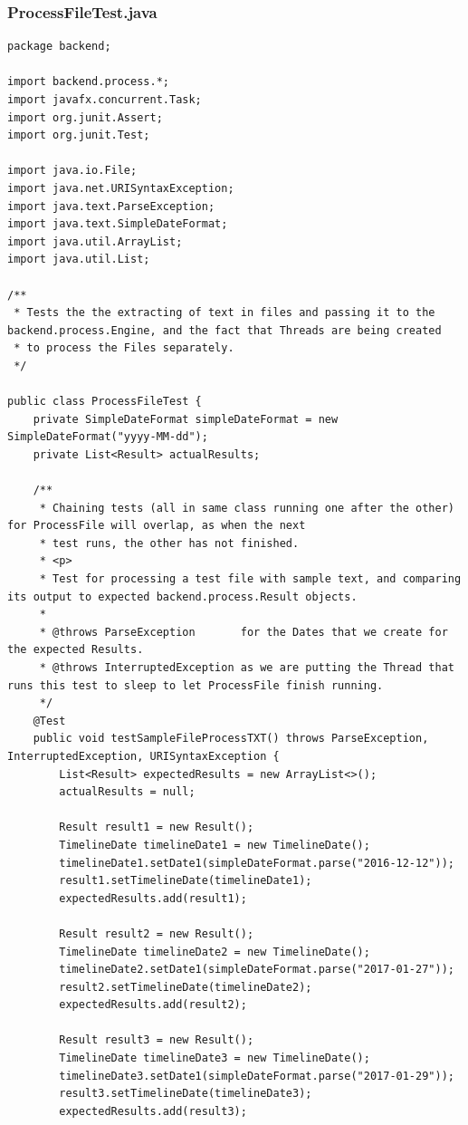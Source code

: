 \subsubsection{ProcessFileTest.java}
\begin{lstlisting}
package backend;

import backend.process.*;
import javafx.concurrent.Task;
import org.junit.Assert;
import org.junit.Test;

import java.io.File;
import java.net.URISyntaxException;
import java.text.ParseException;
import java.text.SimpleDateFormat;
import java.util.ArrayList;
import java.util.List;

/**
 * Tests the the extracting of text in files and passing it to the backend.process.Engine, and the fact that Threads are being created
 * to process the Files separately.
 */

public class ProcessFileTest {
    private SimpleDateFormat simpleDateFormat = new SimpleDateFormat("yyyy-MM-dd");
    private List<Result> actualResults;

    /**
     * Chaining tests (all in same class running one after the other) for ProcessFile will overlap, as when the next
     * test runs, the other has not finished.
     * <p>
     * Test for processing a test file with sample text, and comparing its output to expected backend.process.Result objects.
     *
     * @throws ParseException       for the Dates that we create for the expected Results.
     * @throws InterruptedException as we are putting the Thread that runs this test to sleep to let ProcessFile finish running.
     */
    @Test
    public void testSampleFileProcessTXT() throws ParseException, InterruptedException, URISyntaxException {
        List<Result> expectedResults = new ArrayList<>();
        actualResults = null;

        Result result1 = new Result();
        TimelineDate timelineDate1 = new TimelineDate();
        timelineDate1.setDate1(simpleDateFormat.parse("2016-12-12"));
        result1.setTimelineDate(timelineDate1);
        expectedResults.add(result1);

        Result result2 = new Result();
        TimelineDate timelineDate2 = new TimelineDate();
        timelineDate2.setDate1(simpleDateFormat.parse("2017-01-27"));
        result2.setTimelineDate(timelineDate2);
        expectedResults.add(result2);

        Result result3 = new Result();
        TimelineDate timelineDate3 = new TimelineDate();
        timelineDate3.setDate1(simpleDateFormat.parse("2017-01-29"));
        result3.setTimelineDate(timelineDate3);
        expectedResults.add(result3);


\end{lstlisting}
